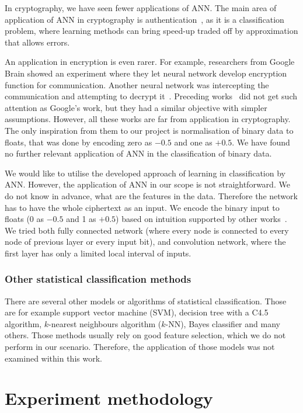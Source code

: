 \documentclass[
  print, %
  Table,   %
  nolof,     %
  nolot,     %
  11pt, %
  oneside  %
]{fithesis3}
\begin{document}
In cryptography, we have seen fewer applications of ANN. The main area of application of ANN in cryptography is authentication~\cite{li2001remote}, as it is a classification problem, where learning methods can bring speed-up traded off by approximation that allows errors.

An application in encryption is even rarer. For example, researchers from Google Brain showed an experiment where they let neural network develop encryption function for communication. Another neural network was intercepting the communication and attempting to decrypt it~\cite{abadi2016learning}. Preceding works~\cite{shihab2006backpropagation, volna2012cryptography} did not get such attention as Google's work, but they had a similar objective with simpler assumptions. However, all these works are far from application in cryptography. The only inspiration from them to our project is normalisation of binary data to floats, that was done by encoding zero as $-0.5$ and one as $+0.5$. We have found no further relevant application of ANN in the classification of binary data.

We would like to utilise the developed approach of learning in classification by ANN. However, the application of ANN in our scope is not straightforward. We do not know in advance, what are the features in the data. Therefore the network has to have the whole ciphertext as an input. We encode the binary input to floats (0 as $-0.5$ and 1 as $+0.5$) based on intuition supported by other works~\cite{abadi2016learning,shihab2006backpropagation}. We tried both fully connected network (where every node is connected to every node of previous layer or every input bit), and convolution network, where the first layer has only a limited local interval of inputs. 


\subsection{Other statistical classification methods}

There are several other models or algorithms of statistical classification. Those are for example support vector machine (SVM), decision tree with a C4.5 algorithm, $k$-nearest neighbours algorithm ($k$-NN), Bayes classifier and many others. Those methods usually rely on good feature selection, which we do not perform in our scenario. Therefore, the application of those models was not examined within this work.


\chapter{Experiment methodology}
\label{chap:method}
\end{document}
